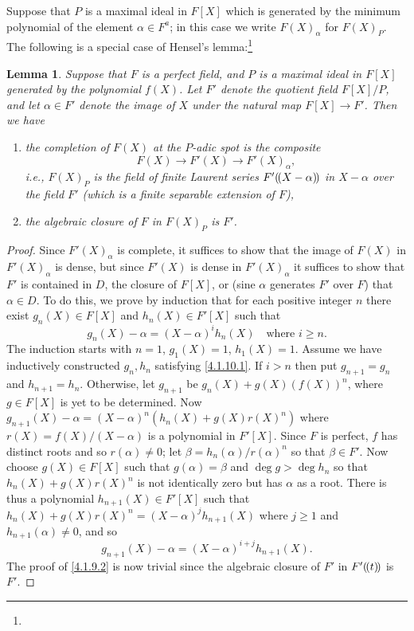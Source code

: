 \documentclass[10pt,leqno]{article}
\newtheorem{lemm}[theo]{Lemma}
\theoremstyle{definition}
\def\ldp{(\mkern-2.5mu(}
\def\rdp{)\mkern-2.5mu)}
\def\fnfoze{}
\begin{document}
Suppose that $P$ is a maximal ideal in $F[X]$ which is generated by the minimum polynomial of the element $\alpha \in F^a$; in this case we write $F(X)_\alpha$ for $F(X)_P$.
The following is a special case of Hensel's lemma:\footnote{\fnfoze}


\begin{lemm}
\label{4.1.10}
Suppose that $F$ is a perfect field, and $P$ is a maximal ideal in $F[X]$ generated by the polynomial $f(X)$.
Let $F'$ denote the quotient field $F[X]/P$, and let $\alpha \in F'$ denote the image of $X$ under the natural map $F[X] \to F'$.
Then we have
\begin{enumerate}
\item
\label{4.1.9.1}
the completion of $F(X)$ at the $P$-adic spot is the composite
\[
F(X) \to F'(X) \to F'(X)_{\alpha},
\]
i.e., $F(X)_P$ is the field of finite Laurent series $F'\ldp X-\alpha \rdp$ in $X-\alpha$ over the field $F'$ (which is a finite separable extension of $F$),

\item
\label{4.1.9.2}
the algebraic closure of $F$ in $F(X)_P$ is $F'$.
\end{enumerate}
\end{lemm}


\begin{proof}
Since $F'(X)_{\alpha}$ is complete, it suffices to show that the image of $F(X)$ in $F'(X)_\alpha$ is dense, but since $F'(X)$ is dense in $F'(X)_\alpha$ it suffices to show that $F'$ is contained in $D$, the closure of $F[X]$, or (sine $\alpha$ generates $F'$ over $F$) that $\alpha \in D$.
To do this, we prove by induction that for each positive integer $n$ there exist $g_n(X) \in F[X]$ and $h_n(X) \in F'[X]$ such that
\begin{equation}
\label{4.1.10.1}
g_n(X) - \alpha = (X-\alpha)^i h_n(X)
\quad
\text{where $i \geq n$.}
\end{equation}
The induction starts with $n=1$, $g_1(X) = 1$, $h_1(X) = 1$.
Assume we have inductively constructed $g_n, h_n$ satisfying \eqref{4.1.10.1}.
If $i > n$ then put $g_{n+1} = g_n$ and $h_{n+1} = h_n$.
Otherwise, let $g_{n+1}$ be $g_n(X) + g(X)( f(X) )^n$, where $g \in F[X]$ is yet to be determined.
Now $g_{n+1}(X) - \alpha = (X-\alpha)^n (h_n(X) + g(X) r(X)^n)$ where $r(X) = f(X) / (X - \alpha)$ is a polynomial in $F'[X]$.
Since $F$ is perfect, $f$ has distinct roots and so $r(\alpha) \not= 0$; let $\beta = h_n(\alpha) / r(\alpha)^n$ so that $\beta \in F'$.
Now choose $g(X) \in F[X]$ such that $g(\alpha) = \beta$ and $\deg g > \deg h_n$ so that $h_n(X) + g(X) r(X)^n$ is not identically zero but has $\alpha$ as a root.
There is thus a polynomial $h_{n+1}(X) \in F'[X]$ such that $h_n(X) + g(X) r(X)^n = (X-\alpha)^j h_{n+1}(X)$ where $j \geq 1$ and $h_{n+1}(\alpha) \not= 0$, and so
\[
g_{n+1}(X) - \alpha = (X - \alpha)^{i+j} h_{n+1}(X).
\]
The proof of \ref{4.1.9.2} is now trivial since the algebraic closure of $F'$ in $F'\ldp t \rdp$ is $F'$.
\end{proof}
\end{document}
